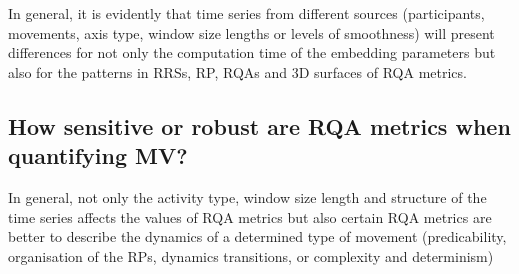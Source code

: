 In general, it is evidently that time series from different sources 
(participants, movements, axis type, window size lengths or 
levels of smoothness) will present differences for not only 
the computation time of the embedding parameters but also for the 
patterns in RRSs, RP, RQAs and 3D surfaces of RQA metrics. 

%

\subsection{How sensitive or robust are RQA metrics when quantifying MV?}

In general, not only the activity type, window size length and structure of 
the time series affects the values of RQA metrics but also certain 
RQA metrics are better to describe the dynamics of a determined type 
of movement (predicability, organisation of the RPs, 
dynamics transitions, or complexity and determinism)
%





